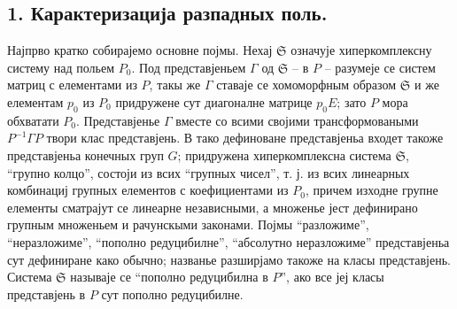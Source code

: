 ﻿\documentclass[11pt]{article}
\newcommand{\mS}{\mathfrak{S}}
\begin{document}
\subsection*{1. Карактеризација разпадных поль.}

\noindent Најпрво кратко собирајемо основне појмы. Нехај $\mS$ означује хиперкомплексну систему над польем $P_0$. Под представјеньем $\Gamma$ од $\mS$ -- в $P$ -- разумеје се систем матриц с елементами из $P$, такы же $\Gamma$ ставаје се хомоморфным образом $\mS$ и же елементам $p_0$ из $P_0$ придружене сут диагоналне матрице $p_0E$; зато $P$ мора обхватати $P_0$. Представјенье $\Gamma$ вместе со всими својими трансформоваными $P^{-1}\Gamma P$ твори клас представјень. В тако дефиноване представјеньа входет такоже представјеньа конечных груп $G$; придружена хиперкомплексна система $\mS$, “групно колцо”, состоји из всих “групных чисел”, т. ј. из всих линеарных комбинациј групных елементов с коефициентами из $P_0$, причем изходне групне елементы сматрајут се линеарне независными, а множенье јест дефинирано групным множеньем и рачунскыми законами. Појмы “разложиме”, “неразложиме”, “пополно редуцибилне”, “абсолутно неразложиме” представјеньа сут дефиниране како обычно; названье разширјамо такоже на класы представјень. Система $\mS$ называје се “пополно редуцибилна в $P$”, ако все јеј класы представјень в $P$ сут пополно редуцибилне.
\end{document}
